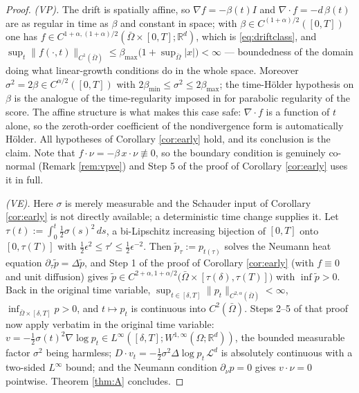 \documentclass[11pt]{amsart}
\theoremstyle{definition}
\newcommand{\Ld}{\mathcal{L}^d}
\newcommand{\dive}{\nabla\!\cdot}
\newcommand{\R}{\mathbb{R}}
\newcommand{\dd}{\,d}
\begin{document}
\begin{proof}
\emph{(VP).} The drift is spatially affine, so $\nabla f=-\beta(t)I$
and $\dive f=-d\,\beta(t)$ are as regular in time as $\beta$ and
constant in space; with $\beta\in C^{(1+\alpha)/2}([0,T])$ one has
$f\in C^{1+\alpha,(1+\alpha)/2}(\bar\Omega\times[0,T];\R^d)$, which
is \eqref{eq:driftclass}, and
$\sup_t\|f(\cdot,t)\|_{C^1(\bar\Omega)}\le
\beta_{\max}\big(1+\sup_{\bar\Omega}|x|\big)<\infty$ --- boundedness
of the domain doing what linear-growth conditions do in the whole
space. Moreover $\sigma^2=2\beta\in C^{\alpha/2}([0,T])$ with
$2\beta_{\min}\le\sigma^2\le2\beta_{\max}$; the time-H\"older
hypothesis on $\beta$ is the analogue of the time-regularity imposed
in \cite{pfode} for parabolic regularity of the score. The affine
structure is what makes this case safe: $\dive f$ is a function of
$t$ alone, so the zeroth-order coefficient of the nondivergence form
is automatically H\"older. All hypotheses of Corollary
\ref{cor:early} hold, and its conclusion is the claim. Note that $f\cdot\nu=-\beta\,x\cdot\nu\not\equiv0$, so
the boundary condition is genuinely co-normal (Remark
\ref{rem:vpve}) and Step 5 of the proof of Corollary
\ref{cor:early} uses it in full.

\emph{(VE).} Here $\sigma$ is merely measurable and the Schauder
input of Corollary \ref{cor:early} is not directly available; a
deterministic time change supplies it. Let
$\tau(t):=\int_0^t\tfrac12\sigma(s)^2\dd s$, a bi-Lipschitz
increasing bijection of $[0,T]$ onto $[0,\tau(T)]$ with
$\tfrac12\epsilon^2\le\tau'\le\tfrac12\epsilon^{-2}$. Then
$\tilde p_\tau:=p_{t(\tau)}$ solves the Neumann heat equation
$\partial_\tau\tilde p=\Delta\tilde p$, and Step 1 of the proof of
Corollary \ref{cor:early} (with $f\equiv0$ and unit diffusion)
gives $\tilde p\in
C^{2+\alpha,1+\alpha/2}\big(\bar\Omega\times[\tau(\delta),\tau(T)]\big)$
with $\inf\tilde p>0$. Back in the original time variable,
$\sup_{t\in[\delta,T]}\|p_t\|_{C^{2,\alpha}(\bar\Omega)}<\infty$,
$\inf_{\bar\Omega\times[\delta,T]}p>0$, and $t\mapsto p_t$ is
continuous into $C^2(\bar\Omega)$. Steps 2--5 of that proof now
apply verbatim in the original time variable:
$v=-\tfrac12\sigma(t)^2\nabla\log p_t\in
L^\infty([\delta,T];W^{1,\infty}(\Omega;\R^d))$, the bounded
measurable factor $\sigma^2$ being harmless;
$D\!\cdot v_t=-\tfrac12\sigma^2\Delta\log p_t\,\Ld$ is absolutely
continuous with a two-sided $L^\infty$ bound; and the Neumann
condition $\partial_\nu p=0$ gives $v\cdot\nu=0$ pointwise. Theorem
\ref{thm:A} concludes.
\end{proof}
\end{document}
